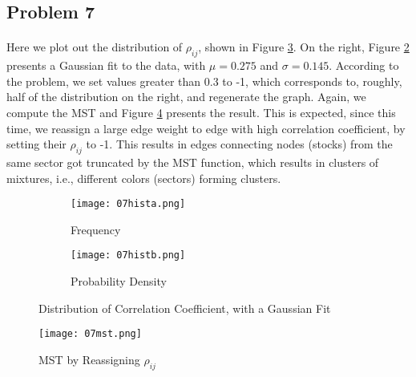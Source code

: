 \subsection*{Problem 7}
\paragraph{}
Here we plot out the distribution of $\rho_{ij}$, shown in Figure \ref{fig:07hist}. On the right, Figure \ref{fig:07histb} presents a Gaussian fit to the data, with $\mu = 0.275$ and $\sigma = 0.145$. According to the problem, we set values greater than 0.3 to -1, which corresponds to, roughly, half of the distribution on the right, and regenerate the graph. Again, we compute the MST and Figure \ref{fig:07mst} presents the result. This is expected, since this time, we reassign a large edge weight to edge with high correlation coefficient, by setting their $\rho_{ij}$ to -1. This results in edges connecting nodes (stocks) from the same sector got truncated by the MST function, which results in clusters of mixtures, i.e., different colors (sectors) forming clusters.

\begin{figure}[h]
	\centering
	\begin{subfigure}{.5\textwidth}
		\centering
		\texttt{[image: 07hista.png]}
		\caption{Frequency}	
		\label{fig:07hista} 
	\end{subfigure}%
	\begin{subfigure}{.5\textwidth}
		\centering
		\texttt{[image: 07histb.png]}
		\caption{Probability Density}
		\label{fig:07histb} 
	\end{subfigure}
	\caption{Distribution of Correlation Coefficient, with a Gaussian Fit}
	\label{fig:07hist}
\end{figure}

\begin{figure}[h!]
	\centering
	\texttt{[image: 07mst.png]}
	\caption{MST by Reassigning $\rho_{ij}$}	
	\label{fig:07mst} 
\end{figure}